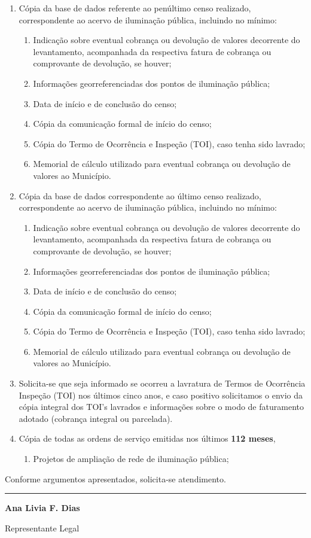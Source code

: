 \documentclass[11pt,a4paper]{article}
\begin{document}
\begin{enumerate}[resume]
\item Cópia da base de dados referente ao penúltimo censo realizado, correspondente ao acervo de iluminação pública, incluindo no mínimo:
\begin{enumerate}
  \item Indicação sobre eventual cobrança ou devolução de valores decorrente do levantamento, acompanhada da respectiva fatura de cobrança ou comprovante de devolução, se houver;
  \item Informações georreferenciadas dos pontos de iluminação pública;
  \item Data de início e de conclusão do censo; 
  \item Cópia da comunicação formal de início do censo;
  \item Cópia do Termo de Ocorrência e Inspeção (TOI), caso tenha sido lavrado;
  \item Memorial de cálculo utilizado para eventual cobrança ou devolução de valores ao Município. 
\end{enumerate}
\item Cópia da base de dados correspondente ao último censo realizado, correspondente ao acervo de iluminação pública, incluindo no mínimo: 
\begin{enumerate}
  \item Indicação sobre eventual cobrança ou devolução de valores decorrente do levantamento, acompanhada da respectiva fatura de cobrança ou comprovante de devolução, se houver; 
  \item Informações georreferenciadas dos pontos de iluminação pública;
  \item Data de início e de conclusão do censo;
  \item Cópia da comunicação formal de início do censo; 
  \item Cópia do Termo de Ocorrência e Inspeção (TOI), caso tenha sido lavrado;
  \item Memorial de cálculo utilizado para eventual cobrança ou devolução de valores ao Município. 
\end{enumerate}
\item Solicita-se que seja informado se ocorreu a lavratura de Termos de Ocorrência Inspeção (TOI) nos últimos cinco anos, e caso positivo solicitamos o envio da cópia integral dos TOI’s lavrados e informações sobre o modo de faturamento adotado (cobrança integral ou parcelada).
\item Cópia de todas as ordens de serviço emitidas nos últimos \textbf{112 meses},
\begin{enumerate}
  \item Projetos de ampliação de rede de iluminação pública;
\end{enumerate}
\end{enumerate}

Conforme argumentos apresentados, solicita-se atendimento.

\vspace{2cm}
\begin{center}
\noindent\rule{6cm}{0.4pt}

\textbf{Ana Livia F. Dias}

{\small Representante Legal}
\end{center}
\end{document}
